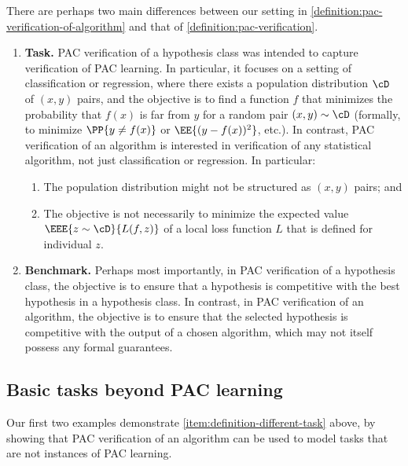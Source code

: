 \documentclass{toc}
\begin{document}
There are perhaps two main differences between our setting in \cref{definition:pac-verification-of-algorithm} and that of \cref{definition:pac-verification}. 
\begin{enumerate}
	\item{
		\label{item:definition-different-task}
		\textbf{Task.} PAC verification of a hypothesis class was intended to capture verification of PAC learning. In particular, it focuses on a setting of classification or regression, where there exists a population distribution $\cD$ of $(x,y)$ pairs, and the objective is to find a function $f$ that minimizes the probability that $f(x)$ is far from $y$ for a random pair $(x,y) \sim \cD$ (formally, to minimize $\PP{y \neq f(x)}$ or $\EE{(y-f(x))^2}$, etc.). 
		In contrast, PAC verification of an algorithm is interested in verification of any statistical algorithm, not just classification or regression. In particular:
		\begin{enumerate}
			\item{
				\label{item:population-not-x-y}
				The population distribution might not be structured as $(x,y)$ pairs; and
			}
			\item{
				\label{item:objective-not-local-expectation}
				The objective is not necessarily to minimize the expected value $\EEE{z \sim \cD}{L(f, z)}$ of a local loss function $L$ that is defined for individual $z$.
			}
		\end{enumerate}
	}
	\item{
		\label{item:definition-different-benchmark}
		\textbf{Benchmark.} Perhaps most importantly, in PAC verification of a hypothesis class, the objective is to ensure that a hypothesis is competitive with the best hypothesis in a hypothesis class. In contrast, in PAC verification of an algorithm, the objective is to ensure that the selected hypothesis is competitive with the output of a chosen algorithm, which may not itself possess any formal guarantees.
	}
\end{enumerate}


\subsection{Basic tasks beyond PAC learning}


Our first two examples demonstrate \cref{item:definition-different-task} above, by showing that PAC verification of an algorithm can be used to model tasks that are not instances of PAC learning.
\end{document}
